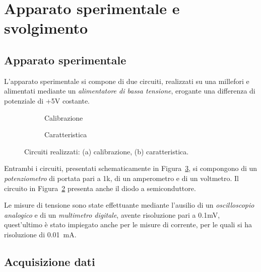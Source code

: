 \documentclass[@MAIN@]{subfiles}
\begin{document}
    \section{Apparato sperimentale e svolgimento} \label{sec:acquisizione}

    \subsection{Apparato sperimentale}\label{subsec:apparato-sperimentale}
    L'apparato sperimentale si compone di due circuiti, realizzati su una millefori
    e alimentati mediante un \textit{alimentatore di bassa tensione},
    erogante una differenza di potenziale di +5V costante.
\vspace{0.5cm}

    \begin{figure}[ht]
        \centering
        \begin{subfigure}[b]{0.4\textwidth}
            \centering
            
            \caption{Calibrazione}
            \label{fig:circuito-calibrazione}
        \end{subfigure}
        \hfill
        \begin{subfigure}[b]{0.55\textwidth}
            \centering
            
            \caption{Caratteristica}
            \label{fig:circuito-caratteristica}
        \end{subfigure}
        \caption{Circuiti realizzati: (a) calibrazione, (b) caratteristica.}
        \label{fig:figura_circuiti}
    \end{figure}

    \newpage
    Entrambi i circuiti, presentati schematicamente in Figura~\ref{fig:figura_circuiti}, si compongono di
    un \textit{potenziometro} di portata pari a 1k\textohm, di un amperometro e
    di un voltmetro.
    Il circuito in Figura~\ref{fig:circuito-caratteristica} presenta anche il diodo
    a semiconduttore.

    Le misure di tensione sono state effettuante mediante l'ausilio di un
    \textit{oscilloscopio analogico} e di un \textit{multimetro digitale}, avente
    risoluzione pari a 0.1mV, quest'ultimo è stato impiegato anche per le misure
    di corrente, per le quali si ha risoluzione di 0.01~mA.
    \vspace{0.2cm}

    \subsection{Acquisizione dati}\label{subsec:acquisizione-dati}
\end{document}
